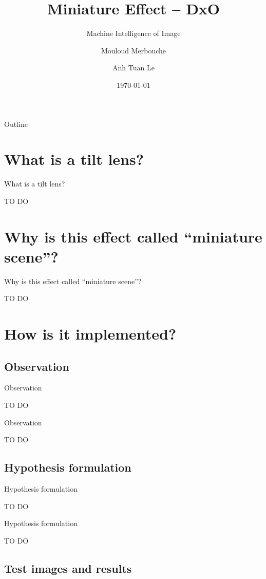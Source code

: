 \documentclass[aspectratio=169, 11pt]{beamer}
\title{Miniature Effect -- DxO}
\subtitle{Machine Intelligence of Image}
\author{Mouloud Merbouche \and Anh Tuan Le}
\institute[]{Master MVA - ENS Paris-Saclay}
\date{\today}
\newcommand{\TODO}{\begin{center}\Large\alert{TO DO}\end{center}}
\begin{document}
\begin{frame}
  \titlepage
\end{frame}

\begin{frame}{Outline}
  \tableofcontents
\end{frame}

\section{What is a tilt lens?}

\begin{frame}{What is a tilt lens?}
  \TODO
\end{frame}

\section{Why is this effect called “miniature scene”?}

\begin{frame}{Why is this effect called “miniature scene”?}
  \TODO
\end{frame}

\section{How is it implemented?}

\subsection{Observation}

\begin{frame}{Observation}
  \TODO
\end{frame}

\begin{frame}{Observation}
  \TODO
\end{frame}

\subsection{Hypothesis formulation}

\begin{frame}{Hypothesis formulation}
  \TODO
\end{frame}

\begin{frame}{Hypothesis formulation}
  \TODO
\end{frame}

\subsection{Test images and results}
\end{document}
